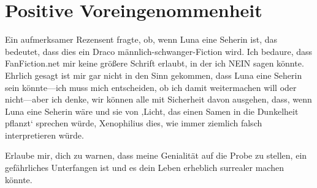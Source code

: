 \chapter{Positive Voreingenommenheit}

\begin{chapterOpeningAuthorNote}
%
Ein aufmerksamer Rezensent fragte, ob, wenn Luna eine Seherin ist, das bedeutet, dass dies ein Draco männlich-schwanger-Fiction wird. Ich bedaure, dass FanFiction.net mir keine größere Schrift erlaubt, in der ich NEIN sagen könnte. Ehrlich gesagt ist mir gar nicht in den Sinn gekommen, dass Luna eine Seherin sein könnte—ich muss mich entscheiden, ob ich damit weitermachen will oder nicht—aber ich denke, wir können alle mit Sicherheit davon ausgehen, dass, wenn Luna eine Seherin wäre und sie von ‚Licht, das einen Samen in die Dunkelheit pflanzt‘ sprechen würde, Xenophilius dies, wie immer ziemlich falsch interpretieren würde.
\end{chapterOpeningAuthorNote}
\begin{chapterOpeningQuote}
Erlaube mir, dich zu warnen, dass meine Genialität auf die Probe zu stellen, ein gefährliches Unterfangen ist und es dein Leben erheblich surrealer machen könnte.
\end{chapterOpeningQuote}

